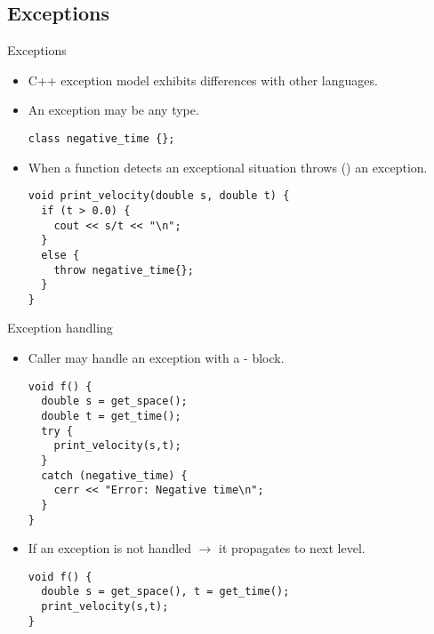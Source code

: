 \subsection{Exceptions}

\begin{frame}[t,fragile]{Exceptions}
\begin{itemize}
  \item C++ exception model exhibits differences with other languages.

  \pause\vfill
  \item An exception may be any type.
\begin{lstlisting}
class negative_time {};
\end{lstlisting}

  \pause\vfill
  \item When a function detects an exceptional situation throws
        () an exception.
\begin{lstlisting}
void print_velocity(double s, double t) {
  if (t > 0.0) {
    cout << s/t << "\n";
  }
  else {
    throw negative_time{};
  }
}
\end{lstlisting}

\end{itemize}
\end{frame}

\begin{frame}[t,fragile]{Exception handling}
\begin{itemize}
  \item Caller may handle an exception with a - block.
\begin{lstlisting}
void f() {
  double s = get_space();
  double t = get_time();
  try {
    print_velocity(s,t);
  }
  catch (negative_time) {
    cerr << "Error: Negative time\n";
  }
}
\end{lstlisting}
  \vfill\pause
  \item If an exception is not handled $\rightarrow$ it propagates to next level.
\begin{lstlisting}
void f() {
  double s = get_space(), t = get_time();
  print_velocity(s,t);
}
\end{lstlisting}
\end{itemize}
\end{frame}

